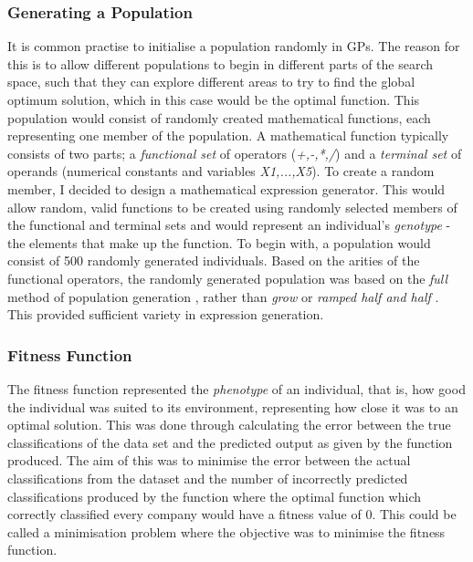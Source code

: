 \documentclass[11pt]{article}
\begin{document}
\subsubsection{Generating a Population}\label{subsubsec:genPo}
It is common practise to initialise a population randomly in GPs. The reason for this is to allow different populations to begin in different parts of the search space, such that they can explore different areas to try to find the global optimum solution, which in this case would be the optimal function.  This population would consist of randomly created mathematical functions, each representing one member of the population. A mathematical function typically consists of two parts; a \textit{functional set} of operators (\textit{+,-,*,/}) and a \textit{terminal set} of operands (numerical constants and variables \textit{X1,...,X5}). To create a random member, I decided to design a mathematical expression generator. This would allow random, valid functions to be created using randomly selected members of the functional and terminal sets and would represent an individual's \textit{genotype} - the elements that make up the function. To begin with, a population would consist of 500 randomly generated individuals. Based on the arities of the functional operators, the randomly generated population was based on the \textit{full} method of population generation \cite{ref-book}, rather than \textit{grow} or \textit{ramped half and half} \cite{ref-koz}. This provided sufficient variety in expression generation.
\subsubsection{Fitness Function}\label{subsubsec:fp}
The fitness function represented the \textit{phenotype} of an individual, that is, how good the individual was suited to its environment, representing how close it was to an optimal solution. This was done through calculating the error between the true classifications of the data set and the predicted output as given by the function produced. The aim of this was to minimise the error between the actual classifications from the dataset and the number of incorrectly predicted classifications produced by the function where the optimal function which correctly classified every company would have a fitness value of 0. This could be called a minimisation problem where the objective was to minimise the fitness function. 
\end{document}
